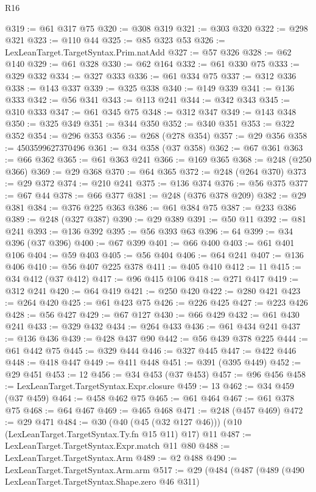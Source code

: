 \begin{lexlean}{R16}
\begin{coremodule}
@319 := @61 @317 @75
@320 := @308 @319
@321 := @303 @320
@322 := @298 @321
@323 := @110 @44
@325 := @85 @323 @53
@326 := LexLeanTarget.TargetSyntax.Prim.natAdd
@327 := @57 @326
@328 := @62 @140
@329 := @61 @328
@330 := @62 @164
@332 := @61 @330 @75
@333 := @329 @332
@334 := @327 @333
@336 := @61 @334 @75
@337 := @312 @336
@338 := @143 @337
@339 := @325 @338
@340 := @149 @339
@341 := @136 @333
@342 := @56 @341
@343 := @113 @241
@344 := @342 @343
@345 := @310 @333
@347 := @61 @345 @75
@348 := @312 @347
@349 := @143 @348
@350 := @325 @349
@351 := @344 @350
@352 := @340 @351
@353 := @322 @352
@354 := @296 @353
@356 := @268 (@278 @354)
@357 := @29 @356
@358 := 4503599627370496
@361 := @34 @358 (@37 @358)
@362 := @67 @361
@363 := @66 @362
@365 := @61 @363 @241
@366 := @169 @365
@368 := @248 (@250 @366)
@369 := @29 @368
@370 := @64 @365
@372 := @248 (@264 @370)
@373 := @29 @372
@374 := @210 @241
@375 := @136 @374
@376 := @56 @375
@377 := @67 @44
@378 := @66 @377
@381 := @248 (@376 @378 @209)
@382 := @29 @381
@384 := @376 @225 @363
@386 := @61 @384 @75
@387 := @233 @386
@389 := @248 (@327 @387)
@390 := @29 @389
@391 := @50 @11
@392 := @81 @241
@393 := @136 @392
@395 := @56 @393 @63
@396 := 64
@399 := @34 @396 (@37 @396)
@400 := @67 @399
@401 := @66 @400
@403 := @61 @401 @106
@404 := @59 @403
@405 := @56 @404
@406 := @64 @241
@407 := @136 @406
@410 := @56 @407 @225 @378
@411 := @405 @410
@412 := 11
@415 := @34 @412 (@37 @412)
@417 := @96 @415 @106
@418 := @271 @417
@419 := @312 @241
@420 := @64 @419
@421 := @250 @420
@422 := @280 @421
@423 := @264 @420
@425 := @61 @423 @75
@426 := @226 @425
@427 := @223 @426
@428 := @56 @427
@429 := @67 @127
@430 := @66 @429
@432 := @61 @430 @241
@433 := @329 @432
@434 := @264 @433
@436 := @61 @434 @241
@437 := @136 @436
@439 := @428 @437 @90
@442 := @56 @439 @378 @225
@444 := @61 @442 @75
@445 := @329 @444
@446 := @327 @445
@447 := @422 @446
@448 := @418 @447
@449 := @411 @448
@451 := @391 (@395 @449)
@452 := @29 @451
@453 := 12
@456 := @34 @453 (@37 @453)
@457 := @96 @456
@458 := LexLeanTarget.TargetSyntax.Expr.closure
@459 := 13
@462 := @34 @459 (@37 @459)
@464 := @458 @462 @75
@465 := @61 @464
@467 := @61 @378 @75
@468 := @64 @467
@469 := @465 @468
@471 := @248 (@457 @469)
@472 := @29 @471
@484 := @30 (@40 (@45 (@32 @127 @46))) (@10 (LexLeanTarget.TargetSyntax.Ty.fn @15 @11) @17) @11
@487 := LexLeanTarget.TargetSyntax.Expr.match @11 @80
@488 := LexLeanTarget.TargetSyntax.Arm
@489 := @2 @488
@490 := LexLeanTarget.TargetSyntax.Arm.arm
@517 := @29
    (@484
      (@487
        (@489
          (@490 LexLeanTarget.TargetSyntax.Shape.zero @46 @311)

\end{coremodule}
\end{lexlean}

